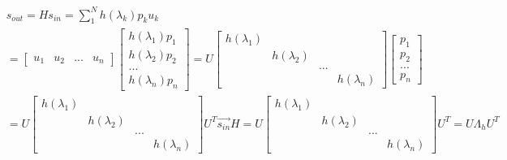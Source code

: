 \documentclass{article}
\begin{document}
\begin{align*}
    & s_{out} = H s_{in} = \sum_{1}^{N} h(\lambda_{k}) p_{k} u_{k}  \\[3pt]
    & = 
        \begin{bmatrix}
            u_{1} & u_{2} & ... & u_{n}
        \end{bmatrix}
        \begin{bmatrix}
            h \left ( \lambda_{1} \right ) p_{1} \\
            h \left ( \lambda_{2} \right ) p_{2} \\
            ... \\
            h \left ( \lambda_{n} \right ) p_{n}
        \end{bmatrix} 
      = 
        U
        \begin{bmatrix}
            h \left ( \lambda_{1} \right ) &  &  & \\
            &  h \left ( \lambda_{2} \right ) &  & \\
            &  &  ... & \\
            &  &  & h \left ( \lambda_{n} \right )
        \end{bmatrix}
        \begin{bmatrix}
            p_{1} \\
            p_{2} \\
            ... \\
            p_{n}
        \end{bmatrix}  \\[3pt]
    & = 
        U
        \begin{bmatrix}
            h \left ( \lambda_{1} \right ) &  &  & \\
            &  h \left ( \lambda_{2} \right ) &  & \\
            &  &  ... & \\
            &  &  & h \left ( \lambda_{n} \right )
        \end{bmatrix}
        U^{T} \overrightarrow{s_{in}} 
        H = 
        U
        \begin{bmatrix}
            h \left ( \lambda_{1} \right ) &  &  & \\
            &  h \left ( \lambda_{2} \right ) &  & \\
            &  &  ... & \\
            &  &  & h \left ( \lambda_{n} \right )
        \end{bmatrix}
        U^{T}
        = 
        U \Lambda_{h} U^{T}
\end{align*}
\end{document}
